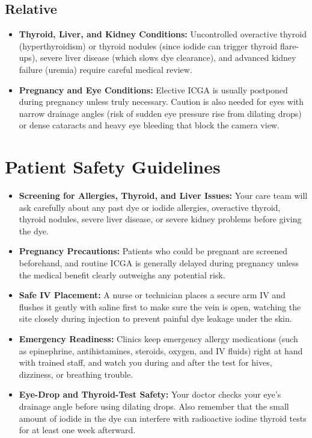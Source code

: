 \subsection{Relative}

\begin{itemize}
    \item \textbf{Thyroid, Liver, and Kidney Conditions:} Uncontrolled overactive thyroid (hyperthyroidism) or thyroid nodules (since iodide can trigger thyroid flare-ups), severe liver disease (which slows dye clearance), and advanced kidney failure (uremia) require careful medical review.
    \item \textbf{Pregnancy and Eye Conditions:} Elective ICGA is usually postponed during pregnancy unless truly necessary. Caution is also needed for eyes with narrow drainage angles (risk of sudden eye pressure rise from dilating drops) or dense cataracts and heavy eye bleeding that block the camera view.
\end{itemize}

\section{Patient Safety Guidelines}

\begin{itemize}
    \item \textbf{Screening for Allergies, Thyroid, and Liver Issues:} Your care team will ask carefully about any past dye or iodide allergies, overactive thyroid, thyroid nodules, severe liver disease, or severe kidney problems before giving the dye.
    \item \textbf{Pregnancy Precautions:} Patients who could be pregnant are screened beforehand, and routine ICGA is generally delayed during pregnancy unless the medical benefit clearly outweighs any potential risk.
    \item \textbf{Safe IV Placement:} A nurse or technician places a secure arm IV and flushes it gently with saline first to make sure the vein is open, watching the site closely during injection to prevent painful dye leakage under the skin.
    \item \textbf{Emergency Readiness:} Clinics keep emergency allergy medications (such as epinephrine, antihistamines, steroids, oxygen, and IV fluids) right at hand with trained staff, and watch you during and after the test for hives, dizziness, or breathing trouble.
    \item \textbf{Eye-Drop and Thyroid-Test Safety:} Your doctor checks your eye's drainage angle before using dilating drops. Also remember that the small amount of iodide in the dye can interfere with radioactive iodine thyroid tests for at least one week afterward.
\end{itemize}

